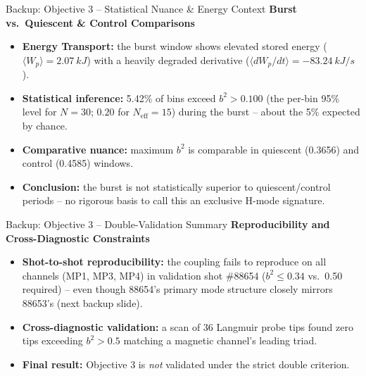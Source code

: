\documentclass[aspectratio=169]{beamer}
\begin{document}
\begin{frame}{Backup: Objective 3 -- Statistical Nuance \& Energy Context}
    \textbf{Burst vs.\ Quiescent \& Control Comparisons}
    \begin{itemize}
        \item \textbf{Energy Transport:} the burst window shows elevated stored
        energy ($\langle W_p\rangle=\SI{2.07}{kJ}$) with a heavily degraded
        derivative ($\langle dW_p/dt\rangle=\SI{-83.24}{kJ/s}$).
        \item \textbf{Statistical inference:} 5.42\% of bins exceed $b^2>0.100$
        (the per-bin 95\% level for $N=30$; $0.20$ for $N_{\text{eff}}=15$) during
        the burst -- about the 5\% expected by chance.
        \item \textbf{Comparative nuance:} maximum $b^2$ is comparable in
        quiescent (0.3656) and control (0.4585) windows.
        \item \textbf{Conclusion:} the burst is not statistically superior to
        quiescent/control periods -- no rigorous basis to call this an
        exclusive H-mode signature.
    \end{itemize}
\end{frame}

\begin{frame}{Backup: Objective 3 -- Double-Validation Summary}
    \textbf{Reproducibility and Cross-Diagnostic Constraints}
    \begin{itemize}
        \item \textbf{Shot-to-shot reproducibility:} the coupling fails
        to reproduce on all channels (MP1, MP3, MP4) in validation shot
        \#88654 ($b^2\le0.34$ vs.\ \num{0.50} required) -- even though
        88654's primary mode structure closely mirrors 88653's (next
        backup slide).
        \item \textbf{Cross-diagnostic validation:} a scan of 36 Langmuir probe
        tips found zero tips exceeding $b^2>0.5$ matching a magnetic channel's
        leading triad.
        \item \textbf{Final result:} Objective 3 is \emph{not} validated
        under the strict double criterion.
    \end{itemize}
\end{frame}
\end{document}
